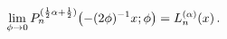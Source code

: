 \[\lim_{\phi\to 0}\mathop{P^{(\frac{1}{2}\alpha+\frac{1}{2})}_{n}\/}\nolimits\!%
\left(-(2\phi)^{-1}x;\phi\right)=\mathop{L^{(\alpha)}_{n}\/}\nolimits\!\left(x%
\right).\]